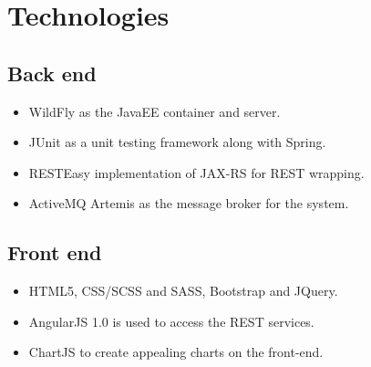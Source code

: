 \documentclass[11pt,a4paper]{article}
\begin{document}
%
	
\section{Technologies}
\subsection{Back end}
\begin{itemize}
	\item WildFly as the JavaEE container and server.
	\item JUnit as a unit testing framework along with Spring.
	\item RESTEasy implementation of JAX-RS for REST wrapping.
	\item ActiveMQ Artemis as the message broker for the system.
\end{itemize}
\subsection{Front end}
\begin{itemize}
	\item HTML5, CSS/SCSS and SASS, Bootstrap and JQuery.
	\item AngularJS 1.0 is used to access the REST services.
	\item ChartJS to create appealing charts on the front-end.
\end{itemize}
\end{document}
